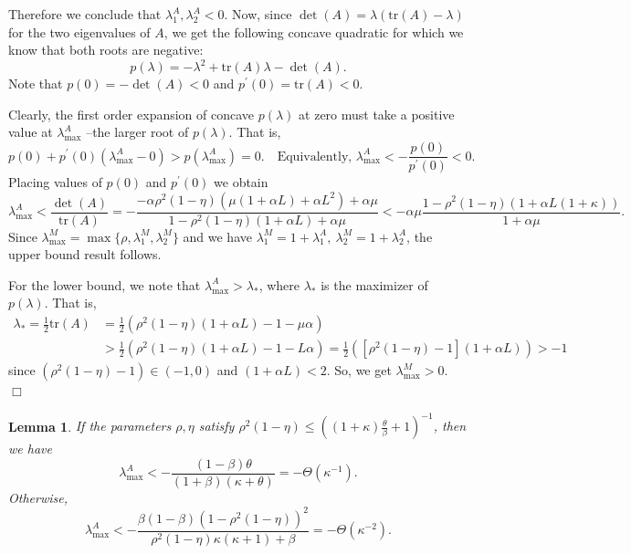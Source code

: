 \documentclass[11pt]{article}
\newtheorem{lem}[thm]{Lemma}
\begin{document}
\bigskip

Therefore we conclude that $\lambda^A_1,\lambda^A_2<0$. Now, since $\det(A)=\lambda(\mbox{tr}(A)-\lambda)$ for the two eigenvalues of $A$, we get the following concave quadratic for which we know that both roots are negative:
\[
 p(\lambda) = -\lambda^2 + \mbox{tr}(A)\lambda -\det(A).  
\]
Note that $p(0) = -\det(A) < 0$ and $p^{\prime}(0) = \mbox{tr}(A) < 0$.

\bigskip\noindent
Clearly, the first order expansion of concave $p(\lambda)$ at zero must take a positive value at $\lambda_{\max}^A$ --the larger root of $p(\lambda)$.  That is,
\[
 p(0)+p^\prime(0) (\lambda_{\max}^A-0) > p(\lambda_{\max}^A)=0. \quad \mbox{Equivalently, } \lambda_{\max}^A<-\frac{p(0)}{p^\prime(0)}<0.
\]
Placing values of $p(0)$ and $p^\prime(0)$ we obtain
\begin{equation}\label{eq:lambdaA}
 \lambda_{\max}^A < \frac{\det(A)}{\mbox{tr}(A)} = -\frac{-\alpha\rho^2(1-\eta)(\mu(1+\alpha L)+\alpha L^2)+\alpha\mu}{1-\rho^2(1-\eta)(1+\alpha  L)+\alpha\mu} < -\alpha\mu\frac{1-\rho^2(1-\eta)(1+\alpha L(1+\kappa))}{1+\alpha\mu}. 
\end{equation}
Since $\lambda^M_{\max} = \max\{\rho,\lambda^M_1,\lambda^M_2\}$ and we have $\lambda^M_1=1+\lambda^A_1,\ \lambda^M_2=1+\lambda^A_2$, the upper bound result follows.  

\bigskip

For the lower bound, we note that $\lambda^A_{\max}>\lambda_\ast$, where $\lambda_\ast$ is the maximizer of $p(\lambda)$. That is, 
\begin{align*}
 \lambda_\ast = \frac{1}{2}\mbox{tr}(A) &= \frac{1}{2}(\rho^2(1-\eta)(1+\alpha  L)-1-\mu\alpha)\\
 &>\frac{1}{2}(\rho^2(1-\eta)(1+\alpha  L)-1-L\alpha) = \frac{1}{2}([\rho^2(1-\eta)-1](1+\alpha  L))>-1
\end{align*}
since $(\rho^2(1-\eta)-1)\in(-1,0)$ and $(1+\alpha L)<2$.  So, we get $\lambda_{\max}^M>0$.
\hspace*{\fill}$\Box$\medskip

\begin{lem}\label{lemma:order}
If the parameters $\rho,\eta$ satisfy $\rho^2(1-\eta) \leq \left((1+\kappa)\frac{\theta}{\beta} + 1\right)^{-1}$, then we have 
\begin{equation}\label{eq:rate1}
\lambda_{\max}^A < -\frac{(1-\beta)\theta}{(1+\beta)(\kappa+\theta)} = -\Theta(\kappa^{-1}).   
\end{equation}
Otherwise, 
\begin{equation}\label{eq:rate2}
 \lambda_{\max}^A < -\frac{\beta(1-\beta)(1-\rho^2(1-\eta))^2}{\rho^2(1-\eta)\kappa(\kappa+1)+\beta} = -\Theta(\kappa^{-2}).
\end{equation}
\end{lem}
\end{document}
